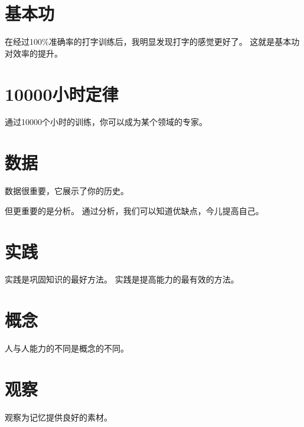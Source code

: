 \section{基本功}


在经过100\%准确率的打字训练后，我明显发现打字的感觉更好了。
这就是基本功对效率的提升。

\section{10000小时定律}
\label{sec:10000}

通过10000个小时的训练，你可以成为某个领域的专家。

\section{数据}

数据很重要，它展示了你的历史。

但更重要的是分析。
通过分析，我们可以知道优缺点，今儿提高自己。

\section{实践}

实践是巩固知识的最好方法。
实践是提高能力的最有效的方法。


\section{概念}

人与人能力的不同是概念的不同。


\section{观察}

观察为记忆提供良好的素材。

